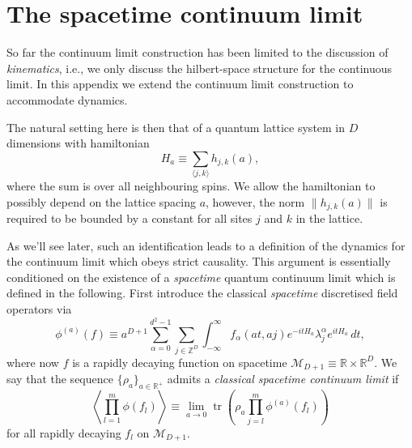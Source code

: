 \documentclass[prl,twocolumn,lengthcheck,superscriptaddress]{revtex4-1}
\newcommand{\tr}{\operatorname{tr}}
\theoremstyle{definition}
\theoremstyle{remark}
\begin{document}



\widetext
\appendix

\section{The spacetime continuum limit}
So far the continuum limit construction has been limited to the discussion of \emph{kinematics}, i.e., we only discuss the hilbert-space structure for the continuous limit. In this appendix we extend the continuum limit construction to accommodate dynamics. 

The natural setting here is then that of a quantum lattice system in $D$ dimensions with hamiltonian 
\begin{equation}
	H_a \equiv \sum_{\langle j,k\rangle } h_{j,k}(a),
\end{equation}
where the sum is over all neighbouring spins. We allow the hamiltonian to possibly depend on the lattice spacing $a$, however, the norm $\|h_{j,k}(a)\|$ is required to be bounded by a constant for all sites $j$ and $k$ in the lattice. 

As we'll see later, such an identification leads to a definition of the dynamics for the continuum limit which obeys strict causality. This argument is essentially conditioned on the existence of a \emph{spacetime} quantum continuum limit which is defined in the following. First introduce the classical \emph{spacetime} discretised field operators via
\begin{equation}
	\phi^{(a)}(f) \equiv a^{D+1}\sum_{\alpha = 0}^{d^2-1}\sum_{j\in\mathbb{Z}^D} \int_{-\infty}^\infty f_\alpha(at, aj) e^{-itH_a}\lambda^\alpha_je^{itH_a} \, dt,
\end{equation}
where now $f$ is a rapidly decaying function on spacetime $\mathcal{M}_{D+1}\equiv\mathbb{R}\times \mathbb{R}^D$. We say that the sequence 
$\{\rho_a\}_{a\in\mathbb{R}^+}$ admits a \emph{classical spacetime continuum limit} if 
\begin{equation}
	\left\langle\prod_{l=1}^m\phi(f_l)\right\rangle \equiv \lim_{a\rightarrow 0} \tr\left(\rho_a \prod_{j=l}^m\phi^{(a)}(f_l)\right)
\end{equation}
for all rapidly decaying $f_l$ on $\mathcal{M}_{D+1}$.
\end{document}
